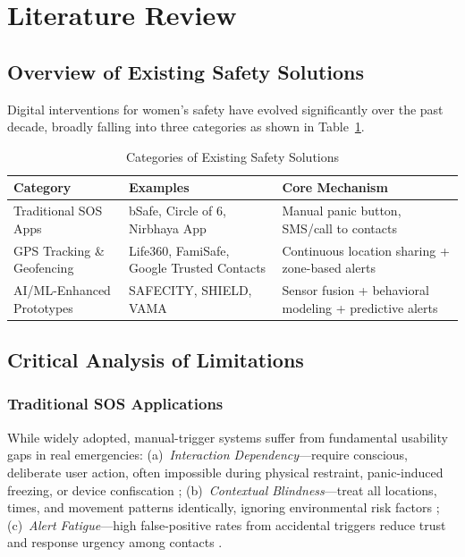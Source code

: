\section{Literature Review}

\subsection{Overview of Existing Safety Solutions}
Digital interventions for women's safety have evolved significantly over the past decade, broadly falling into three categories as shown in Table~\ref{tab:existing_solutions}.

\begin{table}[htbp]
\caption{Categories of Existing Safety Solutions}
\label{tab:existing_solutions}
\centering
\scriptsize
\begin{tabularx}{\columnwidth}{|p{1.6cm}|p{2.2cm}|X|}
\hline
\textbf{Category} & \textbf{Examples} & \textbf{Core Mechanism} \\
\hline
Traditional SOS Apps & bSafe, Circle of 6, Nirbhaya App & Manual panic button, SMS/call to contacts \\
\hline
GPS Tracking \& Geofencing & Life360, FamiSafe, Google Trusted Contacts & Continuous location sharing + zone-based alerts \\
\hline
AI/ML-Enhanced Prototypes & SAFECITY, SHIELD, VAMA & Sensor fusion + behavioral modeling + predictive alerts \\
\hline
\end{tabularx}
\end{table}

\subsection{Critical Analysis of Limitations}

\subsubsection{Traditional SOS Applications}
While widely adopted, manual-trigger systems suffer from fundamental usability gaps in real emergencies: (a)~\textit{Interaction Dependency}---require conscious, deliberate user action, often impossible during physical restraint, panic-induced freezing, or device confiscation \cite{who2018}; (b)~\textit{Contextual Blindness}---treat all locations, times, and movement patterns identically, ignoring environmental risk factors \cite{dhillon2021}; (c)~\textit{Alert Fatigue}---high false-positive rates from accidental triggers reduce trust and response urgency among contacts \cite{uddin2022}.

